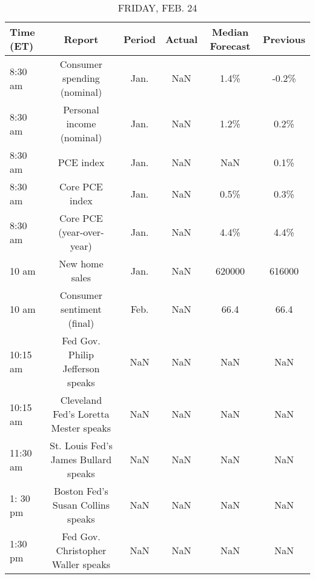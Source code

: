 \documentclass{article}%
\begin{document}
\begin{table}[htbp]%
\caption{FRIDAY, FEB. 24}%
\centering%
\begin{adjustbox}{width=1\textwidth}%
\begin{tabular}{lccccc}
\toprule
Time (ET) &                                Report & Period & Actual & Median Forecast & Previous \\
\midrule
  8:30 am &           Consumer spending (nominal) &   Jan. &    NaN &            1.4\% &    -0.2\% \\
  8:30 am &             Personal income (nominal) &   Jan. &    NaN &            1.2\% &     0.2\% \\
  8:30 am &                             PCE index &   Jan. &    NaN &             NaN &     0.1\% \\
  8:30 am &                        Core PCE index &   Jan. &    NaN &            0.5\% &     0.3\% \\
  8:30 am &             Core PCE (year-over-year) &   Jan. &    NaN &            4.4\% &     4.4\% \\
    10 am &                        New home sales &   Jan. &    NaN &          620000 &   616000 \\
    10 am &            Consumer sentiment (final) &   Feb. &    NaN &            66.4 &     66.4 \\
 10:15 am &      Fed Gov. Philip Jefferson speaks &    NaN &    NaN &             NaN &      NaN \\
 10:15 am & Cleveland Fed's Loretta Mester speaks &    NaN &    NaN &             NaN &      NaN \\
 11:30 am &  St. Louis Fed's James Bullard speaks &    NaN &    NaN &             NaN &      NaN \\
 1: 30 pm &     Boston Fed's Susan Collins speaks &    NaN &    NaN &             NaN &      NaN \\
  1:30 pm &    Fed Gov. Christopher Waller speaks &    NaN &    NaN &             NaN &      NaN \\
\bottomrule
\end{tabular}
%
\end{adjustbox}%
\end{table}
\end{document}
